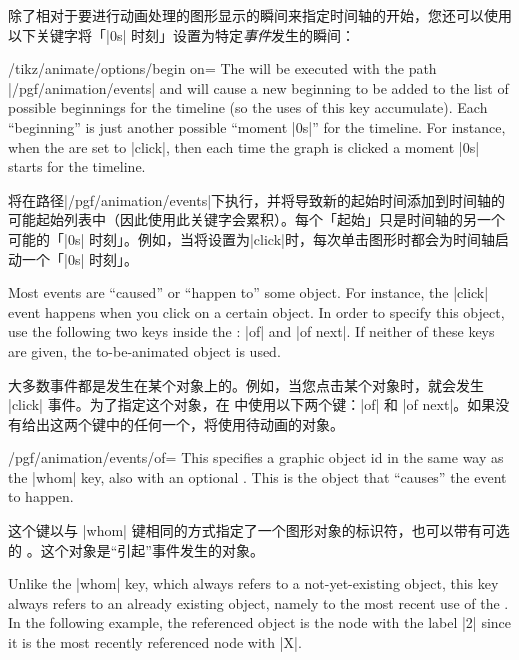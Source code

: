 除了相对于要进行动画处理的图形显示的瞬间来指定时间轴的开始，您还可以使用以下关键字将「|0s| 时刻」设置为特定\emph{事件}发生的瞬间：

\begin{key}{/tikz/animate/options/begin on=}
    The  will be executed with the path |/pgf/animation/events|
    and will cause a new beginning to be added to the list of possible
    beginnings for the timeline (so the uses of this key accumulate). Each
    ``beginning'' is just another possible ``moment |0s|'' for the timeline.
    For instance, when the  are set to |click|, then each time
    the graph is clicked a moment |0s| starts for the timeline.

    将在路径|/pgf/animation/events|下执行，并将导致新的起始时间添加到时间轴的可能起始列表中（因此使用此关键字会累积）。每个「起始」只是时间轴的另一个可能的「|0s| 时刻」。例如，当将设置为|click|时，每次单击图形时都会为时间轴启动一个「|0s| 时刻」。

    Most events are ``caused'' or ``happen to'' some object. For instance, the
    |click| event happens when you click on a certain object. In order to
    specify this object, use the following two keys inside the :
    |of| and |of next|. If neither of these keys are given, the to-be-animated
    object is used.

    大多数事件都是发生在某个对象上的。例如，当您点击某个对象时，就会发生 |click| 事件。为了指定这个对象，在  中使用以下两个键：|of| 和 |of next|。如果没有给出这两个键中的任何一个，将使用待动画的对象。

    \begin{key}{/pgf/animation/events/of=}
        This specifies a graphic object id in the same way as the |whom| key,
        also with an optional . This is the object that ``causes''
        the event to happen.

        这个键以与 |whom| 键相同的方式指定了一个图形对象的标识符，也可以带有可选的 。这个对象是“引起”事件发生的对象。

        Unlike the |whom| key, which always refers to a not-yet-existing
        object, this key always refers to an already existing object, namely to
        the most recent use of the . In the following example, the
        referenced object is the node with the label |2| since it is the most
        recently referenced node with  |X|.
        

\end{key}
\end{key}

